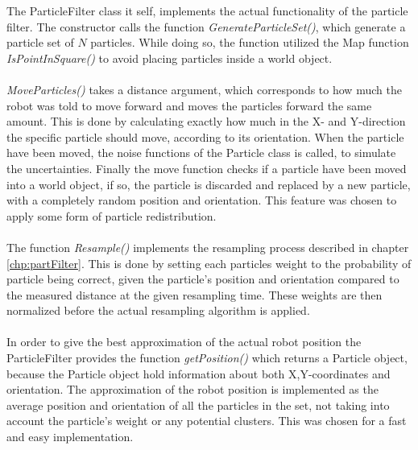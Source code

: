 \noindent The ParticleFilter class it self, implements the actual functionality of the particle filter.
The constructor calls the function \emph{GenerateParticleSet()}, which generate a particle set of $N$ particles. While doing so, the function utilized the Map function \emph{IsPointInSquare()} to avoid placing particles inside a world object.\\\\
%
\emph{MoveParticles()} takes a distance argument, which corresponds to how much the robot was told to move forward and moves the particles forward the same amount.
This is done by calculating exactly how much in the X- and Y-direction the specific particle should move, according to its orientation.
When the particle have been moved, the noise functions of the Particle class is called, to simulate the uncertainties.
Finally the move function checks if a particle have been moved into a world object, if so, the particle is discarded and replaced by a new particle, with a completely random position and orientation.
This feature was chosen to apply some form of particle redistribution.\\\\
%
The function \emph{Resample()} implements the resampling process described in chapter \ref{chp:partFilter}.
This is done by setting each particles weight to the probability of particle being correct, given the particle's position and orientation compared to the measured distance at the given resampling time.
These weights are then normalized before the actual resampling algorithm is applied.\\\\
%
In order to give the best approximation of the actual robot position the ParticleFilter provides the function \emph{getPosition()} which returns a Particle object, because the Particle object hold information about both X,Y-coordinates and orientation.
The approximation of the robot position is implemented as the average position and orientation of all the particles in the set, not taking into account the particle's weight or any potential clusters.
This was chosen for a fast and easy implementation.

  



